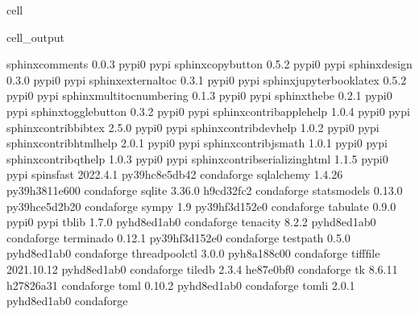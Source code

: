 \documentclass[letterpaper,table,10pt,english]{jupyterBook}
\begin{document}
\begin{sphinxuseclass}{cell}
\begin{sphinxVerbatimOutput}
\begin{sphinxuseclass}{cell_output}
\begin{sphinxVerbatim}[commandchars=\\\{\}]
sphinx\PYGZhy{}comments           0.0.3                    pypi\PYGZus{}0    pypi
sphinx\PYGZhy{}copybutton         0.5.2                    pypi\PYGZus{}0    pypi
sphinx\PYGZhy{}design             0.3.0                    pypi\PYGZus{}0    pypi
sphinx\PYGZhy{}external\PYGZhy{}toc       0.3.1                    pypi\PYGZus{}0    pypi
sphinx\PYGZhy{}jupyterbook\PYGZhy{}latex  0.5.2                    pypi\PYGZus{}0    pypi
sphinx\PYGZhy{}multitoc\PYGZhy{}numbering 0.1.3                    pypi\PYGZus{}0    pypi
sphinx\PYGZhy{}thebe              0.2.1                    pypi\PYGZus{}0    pypi
sphinx\PYGZhy{}togglebutton       0.3.2                    pypi\PYGZus{}0    pypi
sphinxcontrib\PYGZhy{}applehelp   1.0.4                    pypi\PYGZus{}0    pypi
sphinxcontrib\PYGZhy{}bibtex      2.5.0                    pypi\PYGZus{}0    pypi
sphinxcontrib\PYGZhy{}devhelp     1.0.2                    pypi\PYGZus{}0    pypi
sphinxcontrib\PYGZhy{}htmlhelp    2.0.1                    pypi\PYGZus{}0    pypi
sphinxcontrib\PYGZhy{}jsmath      1.0.1                    pypi\PYGZus{}0    pypi
sphinxcontrib\PYGZhy{}qthelp      1.0.3                    pypi\PYGZus{}0    pypi
sphinxcontrib\PYGZhy{}serializinghtml 1.1.5                    pypi\PYGZus{}0    pypi
spinsfast                 2022.4.1         py39hc8e5db4\PYGZus{}2    conda\PYGZhy{}forge
sqlalchemy                1.4.26           py39h3811e60\PYGZus{}0    conda\PYGZhy{}forge
sqlite                    3.36.0               h9cd32fc\PYGZus{}2    conda\PYGZhy{}forge
statsmodels               0.13.0           py39hce5d2b2\PYGZus{}0    conda\PYGZhy{}forge
sympy                     1.9              py39hf3d152e\PYGZus{}0    conda\PYGZhy{}forge
tabulate                  0.9.0                    pypi\PYGZus{}0    pypi
tblib                     1.7.0              pyhd8ed1ab\PYGZus{}0    conda\PYGZhy{}forge
tenacity                  8.2.2              pyhd8ed1ab\PYGZus{}0    conda\PYGZhy{}forge
terminado                 0.12.1           py39hf3d152e\PYGZus{}0    conda\PYGZhy{}forge
testpath                  0.5.0              pyhd8ed1ab\PYGZus{}0    conda\PYGZhy{}forge
threadpoolctl             3.0.0              pyh8a188c0\PYGZus{}0    conda\PYGZhy{}forge
tifffile                  2021.10.12         pyhd8ed1ab\PYGZus{}0    conda\PYGZhy{}forge
tiledb                    2.3.4                he87e0bf\PYGZus{}0    conda\PYGZhy{}forge
tk                        8.6.11               h27826a3\PYGZus{}1    conda\PYGZhy{}forge
toml                      0.10.2             pyhd8ed1ab\PYGZus{}0    conda\PYGZhy{}forge
tomli                     2.0.1              pyhd8ed1ab\PYGZus{}0    conda\PYGZhy{}forge

\end{sphinxVerbatim}
\end{sphinxuseclass}
\end{sphinxVerbatimOutput}
\end{sphinxuseclass}
\end{document}
